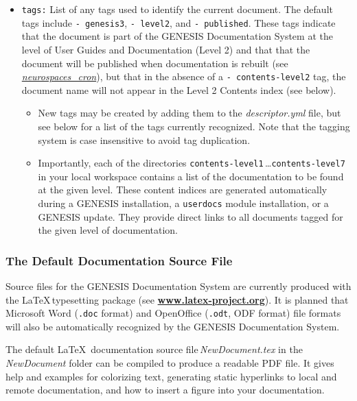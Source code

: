 \documentclass[12pt]{article}
\begin{document}
\begin{itemize}
\item {\tt tags:} List of any tags used to identify the current document. The default tags include {\tt -\,genesis3}, {\tt -\,level2}, and {\tt -\,published}. These tags indicate that the document is part of the GENESIS Documentation System at the level of User Guides and Documentation (Level 2) and that that the document will be published when documentation is rebuilt (see \href{../neurospaces-cron/neurospaces-cron.tex}{\it neurospaces\_cron}), but that in the absence of a {\tt - contents-level2} tag, the document name will not appear in the Level 2 Contents index (see below).

\begin{itemize}

   \item New tags may be created by adding them to the {\it descriptor.yml} file, but see below for a list of the tags currently recognized.  Note that the tagging system is case insensitive to avoid tag duplication.

   \item Importantly, each of the directories {\tt contents-level1}\,\ldots {\tt contents-level7} in your local workspace contains a list of the documentation to be found at the given level. These content indices are generated automatically during a GENESIS installation, a {\tt userdocs} module installation, or a GENESIS update. They provide direct links to all documents tagged for the given level of documentation.
   
\end{itemize}

\end{itemize}

\subsubsection*{The Default Documentation Source File}

Source files for the GENESIS Documentation System are currently produced with the \LaTeX\,typesetting package (see \href{http://www.latex-project.org/}{\bf www.latex-project.org}). It is planned that Microsoft Word ({\tt .doc} format) and OpenOffice ({\tt .odt}, ODF format) file formats will also be automatically recognized by the GENESIS Documentation System.

The default \LaTeX\, documentation source file\,{\it NewDocument.tex} in the {\it NewDocument} folder can be compiled to produce a readable PDF file. It gives help and examples for colorizing text, generating static hyperlinks to local and remote documentation, and how to insert a figure into your documentation.
\end{document}
